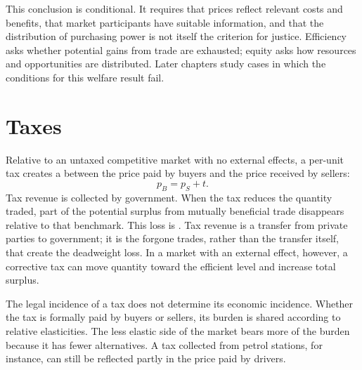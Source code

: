 This conclusion is conditional. It requires that prices reflect relevant costs
and benefits, that market participants have suitable information, and that the
distribution of purchasing power is not itself the criterion for justice.
Efficiency asks whether potential gains from trade are exhausted; equity asks
how resources and opportunities are distributed. Later chapters study cases in
which the conditions for this welfare result fail.

\section{Taxes}

Relative to an untaxed competitive market with no external effects, a per-unit
tax creates a  between the price paid by buyers and the
price received by sellers:
\[
p_B=p_S+t.
\]
Tax revenue is collected by government. When the tax reduces the quantity
traded, part of the potential surplus from mutually beneficial trade disappears
relative to that benchmark. This loss is . Tax revenue
is a transfer from private parties to government; it is the forgone trades,
rather than the transfer itself, that create the deadweight loss. In a market
with an external effect, however, a corrective tax can move quantity toward the
efficient level and increase total surplus.

The legal incidence of a tax does not determine its economic incidence.
Whether the tax is formally paid by buyers or sellers, its burden is shared
according to relative elasticities. The less elastic side of the market bears
more of the burden because it has fewer alternatives. A tax collected from
petrol stations, for instance, can still be reflected partly in the price paid
by drivers.


